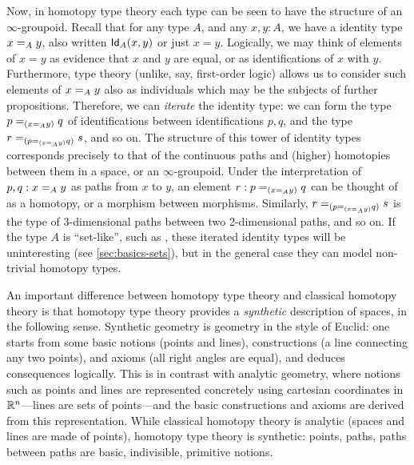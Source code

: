 \mentalpause

Now, in homotopy type theory each type can be seen to have the structure
of an $\infty$-groupoid.  Recall that for any type $A$, and any $x,y:A$,
we have a identity type $\id[A]{x}{y}$, also written $\idtype[A]{x}{y}$
or just $x=y$.  Logically, we may think of elements of $x=y$ as evidence
that $x$ and $y$ are equal, or as identifications of $x$ with
$y$. Furthermore, type theory (unlike, say, first-order logic) allows us
to consider such elements of $\id[A]{x}{y}$ also as individuals which
may be the subjects of further propositions.  Therefore, we can
\emph{iterate} the identity type: we can form the type
$\id[{(\id[A]{x}{y})}]{p}{q}$ of identifications between
identifications $p,q$, and the type
$\id[{(\id[{(\id[A]{x}{y})}]{p}{q})}]{r}{s}$, and so on.  The structure
of this tower of identity types corresponds precisely to that of the
continuous paths and (higher) homotopies between them in a space, or an
$\infty$-groupoid.  Under the interpretation of $p,q : \id[A]{x}{y}$ as
paths from $x$ to $y$, an element $r : \id[{(\id[A]{x}{y})}]{p}{q}$ can
be thought of as a homotopy, or a morphism between morphisms.
Similarly, $\id[{(\id[{(\id[A]{x}{y})}]{p}{q})}]{r}{s}$ is the type of
3-dimensional paths between two 2-dimensional paths, and so on.  If the
type $A$ is ``set-like'', such as \nat, these iterated identity types
will be uninteresting (see \autoref{sec:basics-sets}), but in the
general case they can model non-trivial homotopy types.


An important difference between homotopy type theory and classical homotopy theory is that homotopy type theory provides a \emph{synthetic}
%
description of spaces, in the following sense. Synthetic geometry is geometry in the style of Euclid: one starts from some basic notions (points and lines), constructions (a line connecting any two points), and axioms
(all right angles are equal), and deduces consequences logically.  This is in contrast with analytic
%
geometry, where notions such as points and lines are represented concretely using cartesian coordinates in $\R^n$---lines are sets of points---and the basic constructions and axioms are derived from this representation.  While classical homotopy theory is analytic (spaces and lines are made of points), homotopy type theory is synthetic: points, paths, paths between paths are basic, indivisible, primitive notions.

